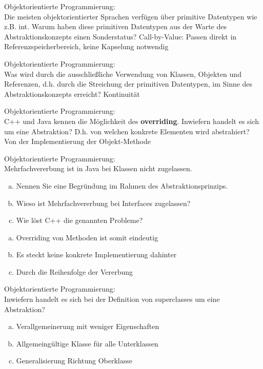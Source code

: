\begin{card}
	Objektorientierte Programmierung:\\
	Die meisten objektorientierter Sprachen verfügen über primitive Datentypen wie z.B. int. Warum haben diese primitiven Datentypen aus der Warte des Abstraktionskonzepts einen Sonderstatus?
	\hr
	Call-by-Value: Passen direkt in Referenzspeicherbereich, keine Kapselung notwendig
\end{card}

\begin{card}
	Objektorientierte Programmierung:\\
	Was wird durch die ausschließliche Verwendung von Klassen, Objekten und Referenzen, d.h. durch die Streichung der primitiven Datentypen, im Sinne des Abstraktionskonzepts erreicht?
	\hr
	Kontinuität
\end{card}

\begin{card}
	Objektorientierte Programmierung:\\
	C++ und Java kennen die Möglichkeit des \textbf{overriding}. Inwiefern handelt es sich um eine Abstraktion? D.h. von welchen konkrete Elementen wird abstrahiert? 
	\hr
	Von der Implementierung der Objekt-Methode
\end{card}

\begin{card}
	Objektorientierte Programmierung:\\
	Mehrfachvererbung ist in Java bei Klassen nicht zugelassen. 
	\begin{enumerate}[a)]
	\item Nennen Sie eine Begründung im Rahmen des Abstraktionsprinzips.
	\item Wieso ist Mehrfachvererbung bei Interfaces zugelassen?
	\item Wie löst C++ die genannten Probleme?
	\end{enumerate}
	\hr
	\begin{enumerate}[a)]
	\item Overriding von Methoden ist somit eindeutig
	\item Es steckt keine konkrete Implementierung dahinter
	\item Durch die Reihenfolge der Vererbung
	\end{enumerate}
\end{card}

\begin{card}
	Objektorientierte Programmierung:\\
	Inwiefern handelt es sich bei der Definition von superclasses um eine Abstraktion?
	\hr
	\begin{enumerate}[a)]
	\item Verallgemeinerung mit weniger Eigenschaften
	\item Allgemeingültige Klasse für alle Unterklassen
	\item Generalisierung Richtung Oberklasse
	\end{enumerate}
\end{card}

